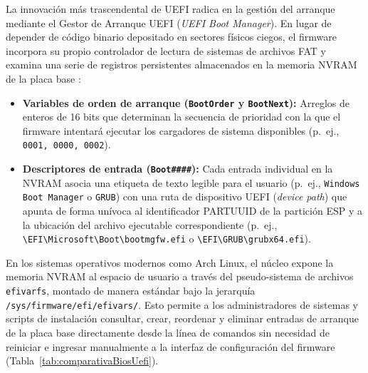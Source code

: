 \documentclass[12pt]{article}
\begin{document}
La innovación más trascendental de UEFI radica en la gestión del arranque mediante el Gestor de Arranque UEFI (\textit{UEFI Boot Manager}). En lugar de depender de código binario depositado en sectores físicos ciegos, el firmware incorpora su propio controlador de lectura de sistemas de archivos FAT y examina una serie de registros persistentes almacenados en la memoria NVRAM de la placa base \parencite{uefi2024specification}:
\begin{itemize}[noitemsep, topsep=2pt]
    \item \textbf{Variables de orden de arranque (\texttt{BootOrder} y \texttt{BootNext}):} Arreglos de enteros de 16 bits que determinan la secuencia de prioridad con la que el firmware intentará ejecutar los cargadores de sistema disponibles (p.~ej., \texttt{0001, 0000, 0002}).
    \item \textbf{Descriptores de entrada (\texttt{Boot\#\#\#\#}):} Cada entrada individual en la NVRAM asocia una etiqueta de texto legible para el usuario (p.~ej., \texttt{Windows Boot Manager} o \texttt{GRUB}) con una ruta de dispositivo UEFI (\textit{device path}) que apunta de forma unívoca al identificador PARTUUID de la partición ESP y a la ubicación del archivo ejecutable correspondiente (p.~ej., \texttt{\textbackslash EFI\textbackslash Microsoft\textbackslash Boot\textbackslash bootmgfw.efi} o \texttt{\textbackslash EFI\textbackslash GRUB\textbackslash grubx64.efi}).
\end{itemize}

En los sistemas operativos modernos como Arch Linux, el núcleo expone la memoria NVRAM al espacio de usuario a través del pseudo-sistema de archivos \texttt{efivarfs}, montado de manera estándar bajo la jerarquía \texttt{/sys/firmware/efi/efivars/}. Esto permite a los administradores de sistemas y scripts de instalación consultar, crear, reordenar y eliminar entradas de arranque de la placa base directamente desde la línea de comandos sin necesidad de reiniciar e ingresar manualmente a la interfaz de configuración del firmware (Tabla~\ref{tab:comparativaBiosUefi}).
\end{document}
